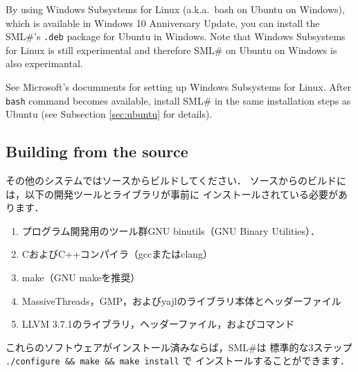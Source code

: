 \documentclass{jbook}
\newcommand{\txt}[2]{#2}
\newcommand{\smlsharp}{SML\#}
\begin{document}

\else%
	By using Windows Subsystems for Linux
(a.k.a.~bash on Ubuntu on Windows),
which is available in Windows 10 Anniversary Update,
you can install the \smlsharp{}'s {\tt .deb} package for Ubuntu in Windows.
	Note that Windows Subsystems for Linux is still experimental
and therefore \smlsharp{} on Ubuntu on Windows is also experimantal.

	See Microsoft's documments for setting up Windows Subsystems for Linux.
	After {\tt bash} command becomes available,
install \smlsharp{} in the same installation steps as Ubuntu
(see Subsection \ref{sec:ubuntu} for details).

\fi%


\subsection{\txt{ソースからビルドする場合}{Building from the source}}
\ifjp%
	その他のシステムではソースからビルドしてください．
	ソースからのビルドには，以下の開発ツールとライブラリが事前に
インストールされている必要があります．
\begin{enumerate}
\item プログラム開発用のツール群GNU binutils（GNU Binary Utilities）．
\item CおよびC++コンパイラ（gccまたはclang）
\item make（GNU makeを推奨）
\item MassiveThreads，GMP，およびyajlのライブラリ本体とヘッダーファイル
\item LLVM 3.7.1のライブラリ，ヘッダーファイル，およびコマンド
\end{enumerate}
	これらのソフトウェアがインストール済みならば，\smlsharp{}は
標準的な3ステップ {\tt ./configure \&\& make \&\& make install} で
インストールすることができます．
\end{document}
